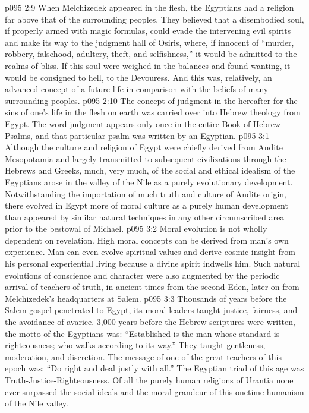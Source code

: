 \vs p095 2:9 When Melchizedek appeared in the flesh, the Egyptians had a religion far above that of the surrounding peoples. They believed that a disembodied soul, if properly armed with magic formulas, could evade the intervening evil spirits and make its way to the judgment hall of Osiris, where, if innocent of “murder, robbery, falsehood, adultery, theft, and selfishness,” it would be admitted to the realms of bliss. If this soul were weighed in the balances and found wanting, it would be consigned to hell, to the Devouress. And this was, relatively, an advanced concept of a future life in comparison with the beliefs of many surrounding peoples.
\vs p095 2:10 The concept of judgment in the hereafter for the sins of one’s life in the flesh on earth was carried over into Hebrew theology from Egypt. The word judgment appears only once in the entire Book of Hebrew Psalms, and that particular psalm was written by an Egyptian.
\vs p095 3:1 Although the culture and religion of Egypt were chiefly derived from Andite Mesopotamia and largely transmitted to subsequent civilizations through the Hebrews and Greeks, much, very much, of the social and ethical idealism of the Egyptians arose in the valley of the Nile as a purely evolutionary development. Notwithstanding the importation of much truth and culture of Andite origin, there evolved in Egypt more of moral culture as a purely human development than appeared by similar natural techniques in any other circumscribed area prior to the bestowal of Michael.
\vs p095 3:2 Moral evolution is not wholly dependent on revelation. High moral concepts can be derived from man’s own experience. Man can even evolve spiritual values and derive cosmic insight from his personal experiential living because a divine spirit indwells him. Such natural evolutions of conscience and character were also augmented by the periodic arrival of teachers of truth, in ancient times from the second Eden, later on from Melchizedek’s headquarters at Salem.
\vs p095 3:3 Thousands of years before the Salem gospel penetrated to Egypt, its moral leaders taught justice, fairness, and the avoidance of avarice. 3,000 years before the Hebrew scriptures were written, the motto of the Egyptians was: “Established is the man whose standard is righteousness; who walks according to its way.” They taught gentleness, moderation, and discretion. The message of one of the great teachers of this epoch was: “Do right and deal justly with all.” The Egyptian triad of this age was Truth\hyp{}Justice\hyp{}Righteousness. Of all the purely human religions of Urantia none ever surpassed the social ideals and the moral grandeur of this onetime humanism of the Nile valley.
